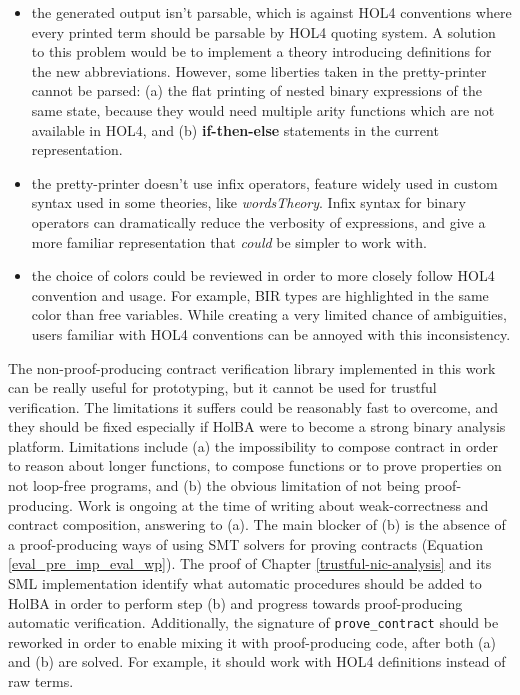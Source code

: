 \documentclass{kththesis}
\begin{document}
{\begin{itemize}
    \item the generated output isn't parsable, which is against HOL4 conventions where every printed term should be parsable by HOL4 quoting system. A solution to this problem would be to implement a theory introducing definitions for the new abbreviations. However, some liberties taken in the pretty-printer cannot be parsed: (a) the flat printing of nested binary expressions of the same state, because they would need multiple arity functions which are not available in HOL4, and (b) \textbf{if-then-else} statements in the current representation.
    \item the pretty-printer doesn't use infix operators, feature widely used in custom syntax used in some theories, like \textit{wordsTheory}. Infix syntax for binary operators can dramatically reduce the verbosity of expressions, and give a more familiar representation that \textit{could} be simpler to work with.
    \item the choice of colors could be reviewed in order to more closely follow HOL4 convention and usage. For example, BIR types are highlighted in the same color than free variables. While creating a very limited chance of ambiguities, users familiar with HOL4 conventions can be annoyed with this inconsistency.
\end{itemize}

The non-proof-producing contract verification library implemented in this work can be really useful for prototyping, but it cannot be used for trustful verification. The limitations it suffers could be reasonably fast to overcome, and they should be fixed especially if HolBA were to become a strong binary analysis platform. Limitations include (a) the impossibility to compose contract in order to reason about longer functions, to compose functions or to prove properties on not loop-free programs, and (b) the obvious limitation of not being proof-producing. Work is ongoing at the time of writing about weak-correctness and contract composition, answering to (a). The main blocker of (b) is the absence of a proof-producing ways of using SMT solvers for proving contracts (Equation \ref{eval_pre_imp_eval_wp}). The proof of Chapter \ref{trustful-nic-analysis} and its SML implementation identify what automatic procedures should be added to HolBA in order to perform step (b) and progress towards proof-producing automatic verification. Additionally, the signature of \texttt{prove\_contract} should be reworked in order to enable mixing it with proof-producing code, after both (a) and (b) are solved. For example, it should work with HOL4 definitions instead of raw terms.


}
\end{document}
